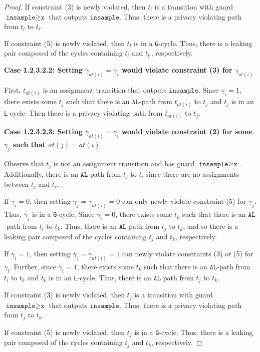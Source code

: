 \documentclass[12pt]{article}
\newcommand{\gguard}[1][x]{\texttt{insample}\geq #1}
\newcommand{\gcycle}{\texttt{G}-cycle}
\newcommand{\lcycle}{\texttt{L}-cycle}
\theoremstyle{definition}
\begin{document}
\begin{proof}
    If constraint (3) is newly violated, then $t_l$ is a transition with guard $\gguard[\texttt{x}]$ that outputs $\texttt{insample}$. Thus, there is a privacy violating path from $t_l$ to $t_{l'}$. 

    If constraint (5) is newly violated, then $t_l$ is in a \gcycle. Thus, there is a leaking pair composed of the cycles containing $t_l$ and $t_{l'}$, respectively.

    \textbf{Case 1.2.3.2.2: Setting $\gamma_{at(i)}=\gamma_i$ would violate constraint (3) for $\gamma_{at(i)}$}

    First, $t_{at(i)}$ is an assignment transition that outputs $\texttt{insample}$. Since $\gamma_i = 1$, there exists some $t_j$ such that there is an $\texttt{AL}$-path from $t_{at(i)}$ to $t_j$ and $t_j$ is in an \lcycle. Then there is a privacy violating path from $t_{at(i)}$ to $t_j$.

    \textbf{Case 1.2.3.2.3: Setting $\gamma_{at(i)}=\gamma_i$ would violate constraint (2) for some $\gamma_j$ such that $at(j) = at(i)$}

    Observe that $t_j$ is not an assignment transition and has guard $\gguard[\texttt{x}]$. Additionally, there is an $\texttt{AL}$-path from $t_j$ to $t_i$ since there are no assignments between $t_j$ and $t_i$. 

    If $\gamma_i =0$, then setting $\gamma_j = \gamma_{at(i)} = 0$ can only newly violate constraint (5) for $\gamma_j$. Thus, $\gamma_j$ is in a \gcycle. Since $\gamma_i = 0$, there exists some $t_{k}$ such that there is an $\texttt{AL}$-path from $t_i$ to $t_{k}$. Thus, there is an $\texttt{AL}$ path from $t_j$ to $t_{k}$, and so there is a leaking pair composed of the cycles containing $t_j$ and $t_{k}$, respectively. 

    If $\gamma_i = 1$, then setting $\gamma_j = \gamma_{at(i)}=1$ can newly violate constraints (3) or (5) for $\gamma_l$. Further, since $\gamma_i =1$, there exists some $t_{k}$ such that there is an $\texttt{AL}$-path from $t_i$ to $t_{k}$ and $t_{k}$ is in an \lcycle. Thus, there is an $\texttt{AL}$ path from $t_j$ to $t_{k}$.
    
    If constraint (3) is newly violated, then $t_j$ is a transition with guard $\gguard[\texttt{x}]$ that outputs $\texttt{insample}$. Thus, there is a privacy violating path from $t_j$ to $t_{k}$. 

    If constraint (5) is newly violated, then $t_j$ is in a \gcycle. Thus, there is a leaking pair composed of the cycles containing $t_j$ and $t_{k}$, respectively.


\end{proof}
\end{document}
